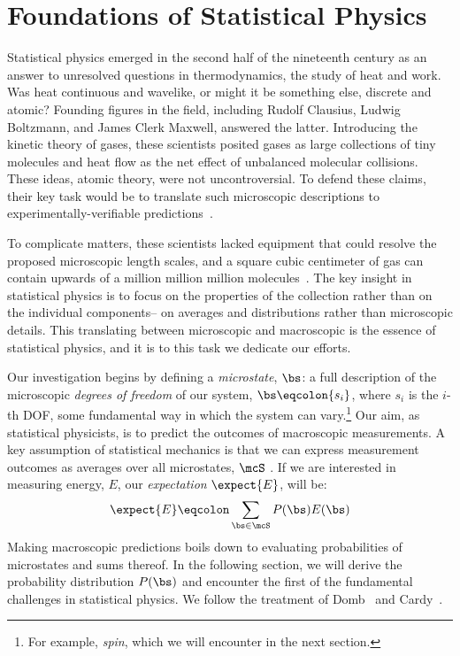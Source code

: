 \chapter{Foundations of Statistical Physics}\label{sec:sm}
Statistical physics emerged in the second half of the nineteenth
century as an answer to unresolved questions in thermodynamics, the
study of heat and work. Was heat continuous and wavelike, or might it
be something else, discrete and atomic? Founding figures in the field,
including Rudolf Clausius, Ludwig Boltzmann, and James Clerk Maxwell,
answered the latter. Introducing the kinetic theory of gases, these
scientists posited gases as large collections of tiny molecules and
heat flow as the net effect of unbalanced molecular collisions. These
ideas, atomic theory, were not uncontroversial. To defend these
claims, their key task would be to translate such microscopic
descriptions to experimentally-verifiable predictions~\cite{domb}.

To complicate matters, these scientists lacked equipment that could
resolve the proposed microscopic length scales, and a square cubic
centimeter of gas can contain upwards of a million million million
molecules~\cite{domb}. The key insight in statistical physics is to
focus on the properties of the collection rather than on the
individual components-- on averages and distributions rather than
microscopic details. This translating between microscopic and
macroscopic is the essence of statistical physics, and it is to this
task we dedicate our efforts.

Our investigation begins by defining a \textit{microstate}, $\bs$: a
full description of the microscopic \textit{degrees of freedom} of our
system, $\bs\eqcolon\{s_i\}$, where $s_i$ is the $i$-th DOF, some
fundamental way in which the system can vary.\footnote{For example,
  \textit{spin}, which we will encounter in the next section.} Our
aim, as statistical physicists, is to predict the outcomes of
macroscopic measurements. A key assumption of statistical mechanics is
that we can express measurement outcomes as averages over all
microstates, $\mcS$ . If we are
interested in measuring energy, $E$, our \textit{expectation}
$\expect{E}$, will be:%
\begin{equation}%
  \expect{E}\eqcolon\sum_{\bs\in\mcS} P(\bs) E(\bs)\label{eq:expectation-as-average}
\end{equation}%
Making macroscopic predictions boils down to evaluating probabilities
of microstates and sums thereof. In the following section, we will
derive the probability distribution $P(\bs)$ and encounter the first
of the fundamental challenges in statistical physics. We follow the
treatment of Domb~\cite{domb} and Cardy~\cite{cardy}.

